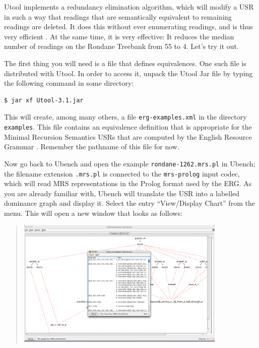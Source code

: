 Utool implements a redundancy elimination algorithm, which will modify a USR in such a way that readings that are semantically equivalent to remaining readings are deleted. It does this without ever enumerating readings, and is thus very efficient \cite{koller06}. At the same time, it is very effective: It reduces the median number of readings on the Rondane Treebank from 55 to 4. Let's try it out.

The first thing you will need is a file that defines equivalences. One such file is distributed with Utool. In order to access it, unpack the Utool Jar file by typing the following command in some directory:

\begin{verbatim}
$ jar xf Utool-3.1.jar
\end{verbatim}

This will create, among many others, a file \verb?erg-examples.xml? in the directory \verb?examples?. This file contains an equivalence definition that is appropriate for the Minimal Recursion Semantics USRs that are computed by the English Resource Grammar \cite{Copestake&Flickinger:LKB}. Remember the pathname of this file for now.

Now go back to Ubench and open the example \verb?rondane-1262.mrs.pl? in Ubench; the filename extension \verb?.mrs.pl? is connected to the \verb?mrs-prolog? input codec, which will read MRS representations in the Prolog format used by the ERG. As you are already familiar with, Ubench will translate the USR into a labelled dominance graph and display it.  Select the entry ``View/Display Chart'' from the menu. This will open a new window that looks as follows:

\begin{quotation}
\includegraphics[width=10cm]{ubench-chart.png}
\end{quotation}

